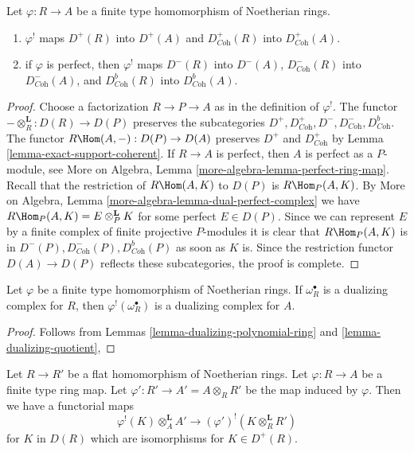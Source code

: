 \begin{lemma}
\label{lemma-shriek-boundedness}
Let $\varphi : R \to A$ be a finite type homomorphism of Noetherian rings.
\begin{enumerate}
\item $\varphi^!$ maps $D^+(R)$ into $D^+(A)$ and
$D^+_{\textit{Coh}}(R)$ into $D^+_{\textit{Coh}}(A)$.
\item if $\varphi$ is perfect, then $\varphi^!$ maps
$D^-(R)$ into $D^-(A)$,
$D^-_{\textit{Coh}}(R)$ into $D^-_{\textit{Coh}}(A)$, and
$D^b_{\textit{Coh}}(R)$ into $D^b_{\textit{Coh}}(A)$.
\end{enumerate}
\end{lemma}

\begin{proof}
Choose a factorization $R \to P \to A$ as in the definition of $\varphi^!$.
The functor $- \otimes_R^\mathbf{L} : D(R) \to D(P)$ preserves
the subcategories
$D^+, D^+_{\textit{Coh}}, D^-, D^-_{\textit{Coh}}, D^b_{\textit{Coh}}$.
The functor $R\Hom(A, -) : D(P) \to D(A)$
preserves $D^+$ and $D^+_{\textit{Coh}}$ by
Lemma \ref{lemma-exact-support-coherent}.
If $R \to A$ is perfect, then $A$ is perfect as a $P$-module, see
More on Algebra, Lemma \ref{more-algebra-lemma-perfect-ring-map}.
Recall that the restriction of $R\Hom(A, K)$ to $D(P)$ is
$R\Hom_P(A, K)$. By More on Algebra, Lemma
\ref{more-algebra-lemma-dual-perfect-complex}
we have $R\Hom_P(A, K) = E \otimes_P^\mathbf{L} K$ for
some perfect $E \in D(P)$. Since we can represent $E$ by
a finite complex of finite projective $P$-modules
it is clear that $R\Hom_P(A, K)$ is in
$D^-(P), D^-_{\textit{Coh}}(P), D^b_{\textit{Coh}}(P)$
as soon as $K$ is. Since the restriction functor
$D(A) \to D(P)$ reflects these subcategories, the
proof is complete.
\end{proof}

\begin{lemma}
\label{lemma-shriek-dualizing-algebraic}
Let $\varphi$ be a finite type homomorphism of Noetherian rings.
If $\omega_R^\bullet$ is a dualizing complex for $R$, then
$\varphi^!(\omega_R^\bullet)$ is a dualizing complex for $A$.
\end{lemma}

\begin{proof}
Follows from Lemmas
\ref{lemma-dualizing-polynomial-ring} and
\ref{lemma-dualizing-quotient},
\end{proof}

\begin{lemma}
\label{lemma-flat-bc}
Let $R \to R'$ be a flat homomorphism of Noetherian rings.
Let $\varphi : R \to A$ be a finite type ring map.
Let $\varphi' : R' \to A' = A \otimes_R R'$ be the map induced by $\varphi$.
Then we have a functorial maps
$$
\varphi^!(K) \otimes_A^\mathbf{L} A' \longrightarrow
(\varphi')^!(K \otimes_R^\mathbf{L} R')
$$
for $K$ in $D(R)$ which are isomorphisms for $K \in D^+(R)$.
\end{lemma}

